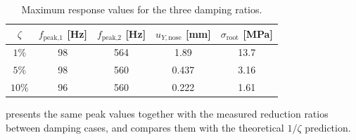 \begin{table}[H]
\centering
\caption{Maximum response values for the three damping ratios.}
\label{tab:damping}
\small
\begin{tabular}{c c c c c}
\toprule
$\zeta$ & $f_\text{peak,1}$ [\si{\hertz}] & $f_\text{peak,2}$ [\si{\hertz}] & $u_{Y,\text{nose}}$ [\si{\milli\metre}] & $\sigma_\text{root}$ [\si{\mega\pascal}] \\
\midrule
$1\%$  & 98 & 564 & \num{1.89} & \num{13.7} \\
$5\%$  & 98 & 560 & \num{0.437} & \num{3.16} \\
$10\%$ & 96 & 560 & \num{0.222} & \num{1.61} \\
\bottomrule
\end{tabular}
\end{table}

 presents the same peak values together with the measured reduction ratios between damping cases, and compares them with the theoretical $1/\zeta$ prediction.

\begin{table}[H]
\centering
    \caption{Peak amplitudes and reduction ratios between damping cases. The theoretical reference assumes $A_\text{peak} \propto 1/\zeta$~\cite{inman_engineering_vibration}.}
\label{tab:damping_ratios}
\small
{}
\end{table}

